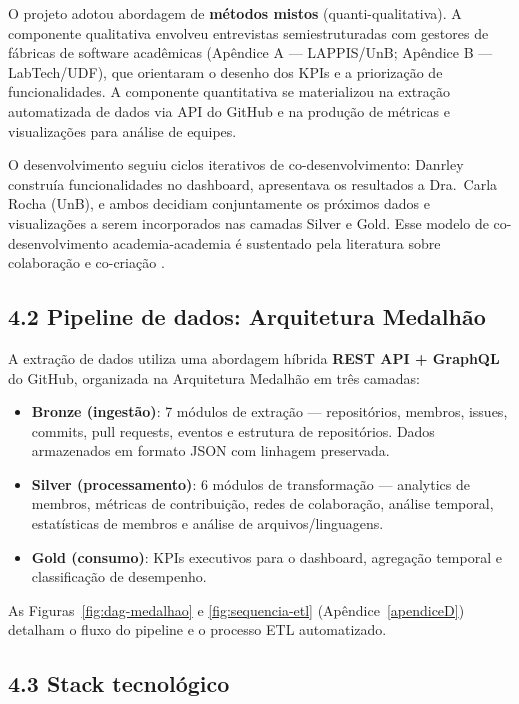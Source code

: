 \documentclass[
	12pt,
	openright,
	oneside,
	a4paper,
	brazil
]{abntex2}
\begin{document}
O projeto adotou abordagem de \textbf{métodos mistos} (quanti-qualitativa). A componente qualitativa envolveu entrevistas semiestruturadas com gestores de fábricas de software acadêmicas (Apêndice A --- LAPPIS/UnB; Apêndice B --- LabTech/UDF), que orientaram o desenho dos KPIs e a priorização de funcionalidades. A componente quantitativa se materializou na extração automatizada de dados via API do GitHub e na produção de métricas e visualizações para análise de equipes.

O desenvolvimento seguiu ciclos iterativos de co-desenvolvimento: Danrley construía funcionalidades no dashboard, apresentava os resultados a Dra.\ Carla Rocha (UnB), e ambos decidiam conjuntamente os próximos dados e visualizações a serem incorporados nas camadas Silver e Gold. Esse modelo de co-desenvolvimento academia-academia é sustentado pela literatura sobre colaboração e co-criação \cite{bjerregaard2021lessons,jarvela2018collaboration,franssen2019cogs}.

\subsection*{4.2 Pipeline de dados: Arquitetura Medalhão}

A extração de dados utiliza uma abordagem híbrida \textbf{REST API + GraphQL} do GitHub, organizada na Arquitetura Medalhão em três camadas:

\begin{itemize}
    \item \textbf{Bronze (ingestão)}: 7 módulos de extração --- repositórios, membros, issues, commits, pull requests, eventos e estrutura de repositórios. Dados armazenados em formato JSON com linhagem preservada.
    \item \textbf{Silver (processamento)}: 6 módulos de transformação --- analytics de membros, métricas de contribuição, redes de colaboração, análise temporal, estatísticas de membros e análise de arquivos/linguagens.
    \item \textbf{Gold (consumo)}: KPIs executivos para o dashboard, agregação temporal e classificação de desempenho.
\end{itemize}

As Figuras~\ref{fig:dag-medalhao} e \ref{fig:sequencia-etl} (Apêndice~\ref{apendiceD}) detalham o fluxo do pipeline e o processo ETL automatizado.

\subsection*{4.3 Stack tecnológico}
\end{document}
